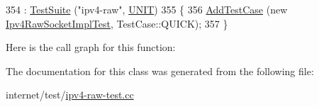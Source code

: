 \begin{DoxyCode}
354                       : \hyperlink{classns3_1_1TestSuite_a904b0c40583b744d30908aeb94636d1a}{TestSuite} (\textcolor{stringliteral}{"ipv4-raw"}, \hyperlink{classns3_1_1TestSuite_a1ebfcab34ec8161e085e8e3a1855eae0a3885375a3787abf60431f8454b3cadbd}{UNIT})
355   \{
356     \hyperlink{classns3_1_1TestCase_a3718088e3eefd5d6454569d2e0ddd835}{AddTestCase} (\textcolor{keyword}{new} \hyperlink{classIpv4RawSocketImplTest}{Ipv4RawSocketImplTest}, TestCase::QUICK);
357   \}
\end{DoxyCode}


Here is the call graph for this function\+:




The documentation for this class was generated from the following file\+:\begin{DoxyCompactItemize}
\item 
internet/test/\hyperlink{ipv4-raw-test_8cc}{ipv4-\/raw-\/test.\+cc}\end{DoxyCompactItemize}
